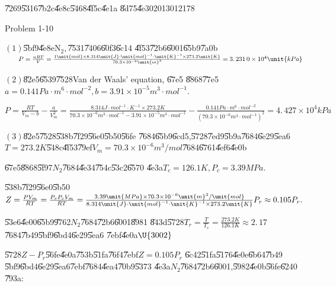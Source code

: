 \documentclass{article}
\begin{document}
\bigskip \U{7269}\U{5316}\U{7b2c}\U{4e8c}\U{5468}\U{4f5c}\U{4e1a}\qquad
\qquad \qquad \U{8d75}\U{4e30}2013012178

Problem 1-10

$\left( 1\right) $\U{5bf9}\U{4e8e}N$_{2},$\U{7531}\U{7406}\U{60f3}\U{6c14}%
\U{4f53}\U{72b6}\U{6001}\U{65b9}\U{7a0b}$\qquad P=\frac{nRT}{V}=\frac{1\unit{%
mol}\times 8.314\unit{J}\cdot \unit{mol}^{-1}\cdot \unit{K}^{-1}\times 273.2%
\unit{K}}{70.3\times 10^{-6}\unit{m}^{3}}=\allowbreak 3.\,\allowbreak
231\,0\times 10^{4}\unit{kPa}$

$\left( 2\right) $\U{82e5}\U{6539}\U{7528}Van der Waals' equation, \U{67e5}%
\U{8868}\U{77e5}\qquad $a=0.141\unit{Pa}\cdot \unit{m}^{6}\cdot \unit{mol}%
^{-2},b=3.91\times 10^{-5}\unit{m}^{3}\cdot \unit{mol}^{-1}.$

$P=\frac{RT}{V_{m}-b}-\frac{a}{V_{m}^{2}}=\frac{8.314\unit{J}\cdot \unit{mol}%
^{-1}\cdot \unit{K}^{-1}\times 273.2\unit{K}}{70.3\times 10^{-6}\unit{m}%
^{3}\cdot \unit{mol}^{-1}-3.91\times 10^{-5}\unit{m}^{3}\cdot \unit{mol}^{-1}%
}-\frac{0.141\unit{Pa}\cdot \unit{m}^{6}\cdot \unit{mol}^{-2}}{\left(
70.3\times 10^{-6}\unit{m}^{3}\cdot \unit{mol}^{-1}\right) ^{2}}=\allowbreak
4.\,\allowbreak 427\times 10^{4}\unit{kPa}$

$\left( 3\right) $\U{82e5}\U{7528}\U{538b}\U{7f29}\U{56e0}\U{5b50}\U{56fe}%
\U{7684}\U{65b9}\U{6cd5},\U{5728}\U{7ed9}\U{5b9a}\U{7684}\U{6e29}\U{5ea6}$%
T=273.2\unit{K}$\U{548c}\U{4f53}\U{79ef}$V_{m}=70.3\times 10^{-6}\unit{m}%
^{3}/\unit{mol}$\U{7684}\U{6761}\U{4ef6}\U{4e0b}

\U{67e5}\U{8868}\U{5f97}$N_{2}$\U{7684}\U{4e34}\U{754c}\U{53c2}\U{6570}%
\U{4e3a}$T_{c}=126.1\unit{K},P_{c}=3.39\unit{MPa}.$

\U{538b}\U{7f29}\U{56e0}\U{5b50}$Z=\frac{PV_{m}}{RT}=\frac{P_{r}P_{c}V_{m}}{%
RT}=\frac{3.39\unit{MPa}\times 70.3\times 10^{-6}\unit{m}^{3}/\unit{mol}}{%
8.314\unit{J}\cdot \unit{mol}^{-1}\cdot \unit{K}^{-1}\times 273.2\unit{K}}%
P_{r}\approx \allowbreak 0.105P_{r}.$

\U{53e6}\U{4e00}\U{65b9}\U{9762}$N_{2}$\U{7684}\U{72b6}\U{6001}\U{8981}%
\U{843d}\U{5728}$T_{r}=\frac{T}{T_{c}}=\frac{273.2\unit{K}}{126.1\unit{K}}%
\approx 2.\,\allowbreak 17$\U{7684}\U{7b49}\U{5bf9}\U{6bd4}\U{6e29}\U{5ea6}%
\U{7ebf}\U{4e0a}$\U{3002} $

\U{5728}$Z-P_{r}$\U{56fe}\U{4e0a}\U{753b}\U{51fa}\U{76f4}\U{7ebf}$%
\allowbreak Z=0.105P_{r}$ \U{6c42}\U{51fa}\U{5176}\U{4e0e}\U{6b64}\U{7b49}%
\U{5bf9}\U{6bd4}\U{6e29}\U{5ea6}\U{7ebf}\U{7684}\U{4ea4}\U{70b9}\U{5373}%
\U{4e3a}$N_{2}$\U{7684}\U{72b6}\U{6001},\U{5982}\U{4e0b}\U{56fe}\U{6240}%
\U{793a}$:$
\end{document}
